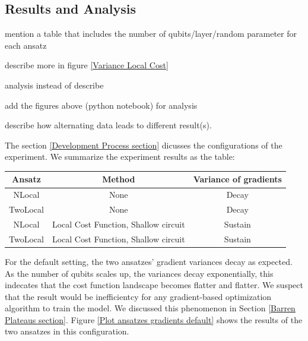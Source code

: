 \subsection{Results and Analysis}

\begin{todolist}
\item mention a table that includes the number of qubits/layer/random parameter for each ansatz
\item describe more in figure \ref{Variance Local Cost}
\item analysis instead of describe
\item add the figures above (python notebook) for analysis
\item describe how alternating data leads to different result(s).
\end{todolist}

The section \ref{Development Process section} dicusses the configurations of the experiment. 
We summarize the experiment results as the table:
\begin{center}
    \begin{tabular}{|| c c c ||}
        \hline
        Ansatz      & Method                                & Variance of gradients \\[0.5ex] 
        \hline \hline
        NLocal      & None                                  & Decay                 \\
        \hline
        TwoLocal    & None                                  & Decay                 \\
        \hline
        NLocal      & Local Cost Function, Shallow circuit  & Sustain               \\
        \hline
        TwoLocal    & Local Cost Function, Shallow circuit  & Sustain               \\
        \hline
    \end{tabular}
\end{center}

For the default setting, the two ansatzes' gradient variances decay as expected.
As the number of qubits scales up, the variances decay exponentially, this indecates that the cost function landscape becomes flatter and flatter. 
We suspect that the result would be inefficientcy for any gradient-based optimization algorithm to train the model.
We discussed this phenomenon in Section \ref{Barren Plateaus section}.
Figure \ref{Plot ansatzes gradients default} shows the results of the two ansatzes in this configuration.

